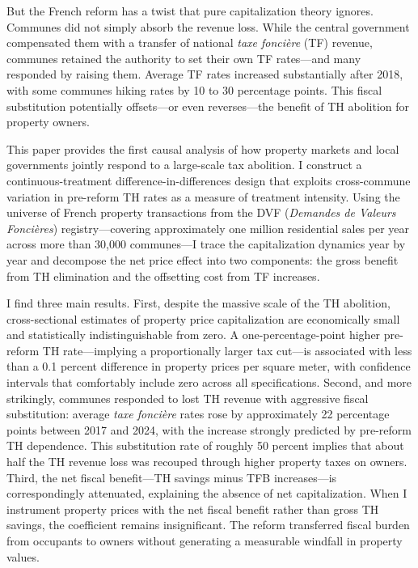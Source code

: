 \documentclass[12pt]{article}
\begin{document}
But the French reform has a twist that pure capitalization theory ignores. Communes did not simply absorb the revenue loss. While the central government compensated them with a transfer of national \emph{taxe fonci\`ere} (TF) revenue, communes retained the authority to set their own TF rates---and many responded by raising them. Average TF rates increased substantially after 2018, with some communes hiking rates by 10 to 30 percentage points. This fiscal substitution potentially offsets---or even reverses---the benefit of TH abolition for property owners.

This paper provides the first causal analysis of how property markets and local governments jointly respond to a large-scale tax abolition. I construct a continuous-treatment difference-in-differences design that exploits cross-commune variation in pre-reform TH rates as a measure of treatment intensity. Using the universe of French property transactions from the DVF (\emph{Demandes de Valeurs Fonci\`eres}) registry---covering approximately one million residential sales per year across more than 30,000 communes---I trace the capitalization dynamics year by year and decompose the net price effect into two components: the gross benefit from TH elimination and the offsetting cost from TF increases.

I find three main results. First, despite the massive scale of the TH abolition, cross-sectional estimates of property price capitalization are economically small and statistically indistinguishable from zero. A one-percentage-point higher pre-reform TH rate---implying a proportionally larger tax cut---is associated with less than a 0.1 percent difference in property prices per square meter, with confidence intervals that comfortably include zero across all specifications. Second, and more strikingly, communes responded to lost TH revenue with aggressive fiscal substitution: average \emph{taxe fonci\`ere} rates rose by approximately 22 percentage points between 2017 and 2024, with the increase strongly predicted by pre-reform TH dependence. This substitution rate of roughly 50 percent implies that about half the TH revenue loss was recouped through higher property taxes on owners. Third, the net fiscal benefit---TH savings minus TFB increases---is correspondingly attenuated, explaining the absence of net capitalization. When I instrument property prices with the net fiscal benefit rather than gross TH savings, the coefficient remains insignificant. The reform transferred fiscal burden from occupants to owners without generating a measurable windfall in property values.
\end{document}
